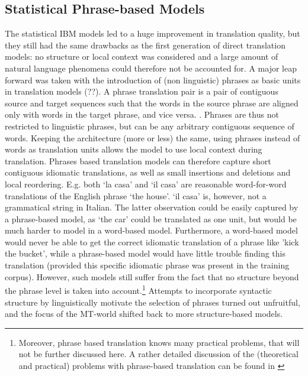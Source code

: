 \documentclass{report}
\theoremstyle{definition}
\theoremstyle{plain}
\begin{document}
\subsection{Statistical Phrase-based Models}


The statistical IBM models led to a huge improvement in translation quality, but they still had the same drawbacks as the first generation of direct translation models: no structure or local context was considered and a large amount of natural language phenomena could therefore not be accounted for. A major leap forward was taken with the introduction of (non linguistic) phrases as basic units in translation models (\cite{wang1998grammar,och1999improved}??). A phrase translation pair is a pair of contiguous source and target sequences such that the words in the source phrase are aligned only with words in the target phrase, and vice versa. \citep{och2004alignment}. Phrases are thus not restricted to linguistic phrases, but can be any arbitrary contiguous sequence of words. Keeping the architecture (more or less) the same, using phrases instead of words as translation units allows the model to use local context during translation. Phrases based translation models can therefore capture short contiguous idiomatic translations, as well as small insertions and deletions and local reordering. E.g. both `la casa' and `il casa' are reasonable word-for-word translations of the English phrase `the house'. `il casa' is, however, not a grammatical string in Italian. The latter observation could be easily captured by a phrase-based model, as `the car' could be translated as one unit, but would be much harder to model in a word-based model. Furthermore, a word-based model would never be able to get the correct idiomatic translation of a phrase like 'kick the bucket', while a phrase-based model would have little trouble finding this translation (provided this specific idiomatic phrase was present in the training corpus). However, such models still suffer from the fact that no structure beyond the phrase level is taken into account.\footnote{Moreover, phrase based translation knows many practical problems, that will not be further discussed here. A rather detailed discussion of the (theoretical and practical) problems with phrase-based translation can be found in \cite{quirk2006we}} Attempts to incorporate syntactic structure by linguistically motivate the selection of phrases \cite{koehn2003statistical} turned out unfruitful, and the focus of the MT-world shifted back to more structure-based models.
\end{document}

